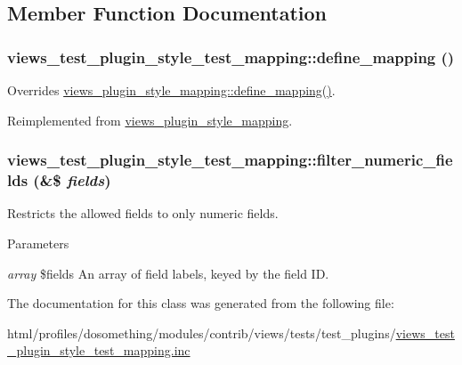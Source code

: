 \subsection{Member Function Documentation}
\hypertarget{classviews__test__plugin__style__test__mapping_a40be2a1b82e66c70464a489a15a56e1a}{
\subsubsection[{define\_\-mapping}]{\setlength{\rightskip}{0pt plus 5cm}views\_\-test\_\-plugin\_\-style\_\-test\_\-mapping::define\_\-mapping ()}}
\label{classviews__test__plugin__style__test__mapping_a40be2a1b82e66c70464a489a15a56e1a}
Overrides \hyperlink{classviews__plugin__style__mapping_a283619a0ae0e76eefd0b0189126a17ed}{views\_\-plugin\_\-style\_\-mapping::define\_\-mapping()}. 

Reimplemented from \hyperlink{classviews__plugin__style__mapping_a283619a0ae0e76eefd0b0189126a17ed}{views\_\-plugin\_\-style\_\-mapping}.\hypertarget{classviews__test__plugin__style__test__mapping_ab5b5f3002b5814e4d7a4f5543ca3633d}{
\subsubsection[{filter\_\-numeric\_\-fields}]{\setlength{\rightskip}{0pt plus 5cm}views\_\-test\_\-plugin\_\-style\_\-test\_\-mapping::filter\_\-numeric\_\-fields (\&\$ {\em fields})}}
\label{classviews__test__plugin__style__test__mapping_ab5b5f3002b5814e4d7a4f5543ca3633d}
Restricts the allowed fields to only numeric fields.


\begin{DoxyParams}{Parameters}
\item[{\em array}]\$fields An array of field labels, keyed by the field ID. \end{DoxyParams}


The documentation for this class was generated from the following file:\begin{DoxyCompactItemize}
\item 
html/profiles/dosomething/modules/contrib/views/tests/test\_\-plugins/\hyperlink{views__test__plugin__style__test__mapping_8inc}{views\_\-test\_\-plugin\_\-style\_\-test\_\-mapping.inc}\end{DoxyCompactItemize}
